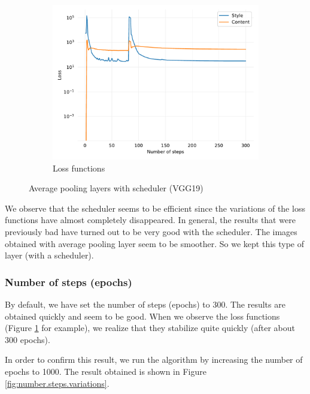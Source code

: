 \documentclass[twocolumn,superscriptaddress,aps, floatfix]{revtex4-1}
\begin{document}
\begin{figure}[ht]
\begin{subfigure}[b]{0.22\textwidth}
            \includegraphics[width=\textwidth]{resources/pdf/architecture/sun-trees-paris-avgpool-scheduler.pdf}
            \caption{Loss functions}
        \end{subfigure}
        \caption{Average pooling layers with scheduler (VGG19)}
        \label{fig:model.architecture.loss.scheduler}
    \end{figure}
    
    We observe that the scheduler seems to be efficient since the variations of the loss functions have almost completely disappeared. In general, the results that were previously bad have turned out to be very good with the scheduler. The images obtained with average pooling layer seem to be smoother. So we kept this type of layer (with a scheduler).
    
    \subsubsection{Number of steps (epochs)}
    
    By default, we have set the number of steps (epochs) to 300. The results are obtained quickly and seem to be good. When we observe the loss functions (Figure \ref{fig:model.architecture.loss.scheduler} for example), we realize that they stabilize quite quickly (after about 300 epochs).
    
    In order to confirm this result, we run the algorithm by increasing the number of epochs to 1000. The result obtained is shown in Figure \ref{fig:number.steps.variations}.
    
\end{document}
